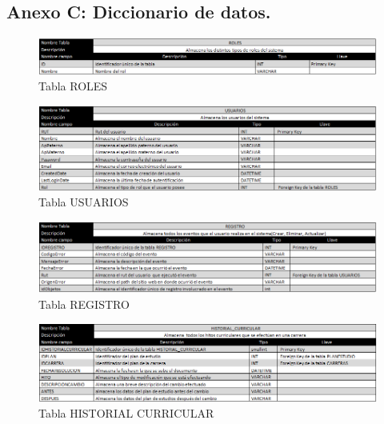  
 
 \subsection*{Anexo C: Diccionario de datos.} 
 
 	\begin{figure}[H]
 		\centering
 		\includegraphics[width=1\textwidth]{images/Anexos/TABLA_ROLES.png}
 		\caption[Tabla ROLES ]{Tabla ROLES}
 		\label{TABLA_ROLES}
 	\end{figure}
 	
 	\begin{figure}[H]
 		\centering
 		\includegraphics[width=1\textwidth]{images/Anexos/TABLA_USUARIOS.png}
 		\caption[Tabla USUARIOS ]{Tabla USUARIOS}
 		\label{TABLA_USUARIOS}
 	\end{figure}

 	\begin{figure}[H]
 		\centering
 		\includegraphics[width=1\textwidth]{images/Anexos/TABLA_REGISTRO.png}
 		\caption[Tabla REGISTRO ]{Tabla REGISTRO}
 		\label{TABLA_REGISTRO}
 	\end{figure}
 	
 	\begin{figure}[H]
 		\centering
 		\includegraphics[width=1\textwidth]{images/Anexos/TABLA_HISTORIAL_CURRICULAR.png}
 		\caption[Tabla HISTORIAL CURRICULAR ]{Tabla HISTORIAL CURRICULAR}
 		\label{TABLA_HISTORIAL_CURRICULAR}
 	\end{figure}
 	

